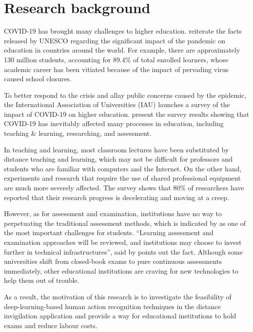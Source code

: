 \section{Research background}
\label{sec:Research background}
COVID-19 has brought many challenges to higher education.
\citet{marinoni2020impact} reiterate the facts released by UNESCO regarding the significant impact of the pandemic on education in countries around the world.
For example, there are approximately 130 million students, accounting for 89.4\% of total enrolled learners, whose academic career has been vitiated because of the impact of pervading virus caused school closures.

To better respond to the crisis and allay public concerns caused by the epidemic, the International Association of Universities (IAU) launches a survey of the impact of COVID-19 on higher education.
\citet{marinoni2020impact} present the survey results showing that COVID-19 has inevitably affected many processes in education, including teaching \& learning, researching, and assessment.

In teaching and learning, most classroom lectures have been substituted by distance teaching and learning, which may not be difficult for professors and students who are familiar with computers and the Internet.
On the other hand, experiments and research that require the use of shared professional equipment are much more severely affected.
The survey shows that 80\% of researchers have reported that their research progress is decelerating and moving at a creep.

However, as for assessment and examination, institutions have no way to perpetuating the traditional assessment methods, which is indicated by \citet{clark2020testing} as one of the most important challenges for students.
``Learning assessment and examination approaches will be reviewed, and institutions may choose to invest further in technical infrastructures'', said by \citet{marinoni2020impact} points out the fact.
Although some universities shift from closed-book exams to pure continuous assessments immediately, other educational institutions are craving for new technologies to help them out of trouble.

As a result, the motivation of this research is to investigate the feasibility of deep-learning-based human action recognition techniques in the distance invigilation application and provide a way for educational institutions to hold exams and reduce labour costs.

